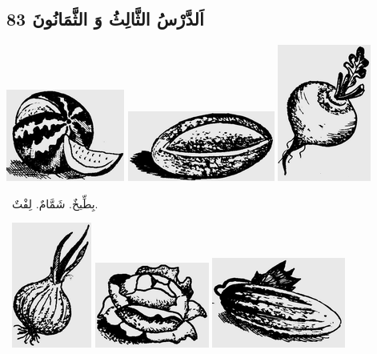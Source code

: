 \documentclass[a5paper]{article}
\begin{document}
\subsection{اَلدَّرْسُ الثَّالِثُ وَ الثَّمَانُونَ 83}
 \includegraphics[width=1.5311in,height=1.1874in]{images/MuhammadBagauddinprettified-img236.png}   \includegraphics[width=1.9063in,height=0.9063in]{images/MuhammadBagauddinprettified-img237.png}  \includegraphics[width=1.2083in,height=1.7709in]{images/MuhammadBagauddinprettified-img238.png} 

\ بِطِّيخٌ. شَمَّامٌ. لِفْتٌ. 

\  \includegraphics[width=1.0311in,height=1.6252in]{images/MuhammadBagauddinprettified-img239.png}   \includegraphics[width=1.4791in,height=1.1043in]{images/MuhammadBagauddinprettified-img240.png}   \includegraphics[width=1.7291in,height=1.1665in]{images/MuhammadBagauddinprettified-img241.png} 
\end{document}

